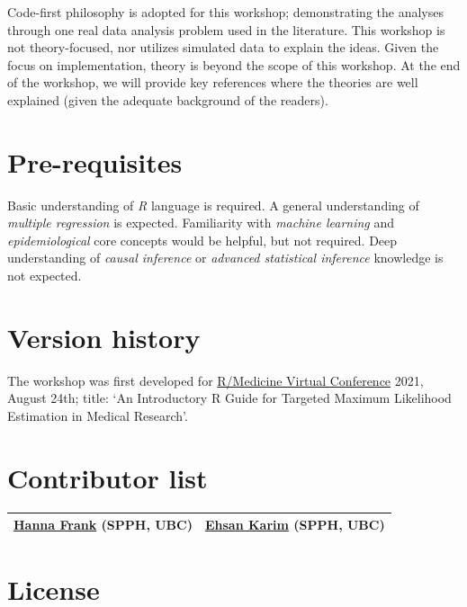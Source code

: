 \documentclass[
]{book}
\begin{document}
Code-first philosophy is adopted for this workshop; demonstrating the analyses through one real data analysis problem used in the literature. This workshop is not theory-focused, nor utilizes simulated data to explain the ideas. Given the focus on implementation, theory is beyond the scope of this workshop. At the end of the workshop, we will provide key references where the theories are well explained (given the adequate background of the readers).

\hypertarget{pre-requisites}{%
\section*{Pre-requisites}\label{pre-requisites}}

Basic understanding of \emph{R} language is required. A general understanding of \emph{multiple regression} is expected. Familiarity with \emph{machine learning} and \emph{epidemiological} core concepts would be helpful, but not required. Deep understanding of \emph{causal inference} or \emph{advanced statistical inference} knowledge is not expected.

\hypertarget{version-history}{%
\section*{Version history}\label{version-history}}

The workshop was first developed for \href{https://r-medicine.org/schedule/}{R/Medicine
Virtual Conference} 2021, August 24th; title: `An Introductory R Guide for Targeted Maximum Likelihood Estimation in Medical Research'.

\hypertarget{contributor-list}{%
\section*{Contributor list}\label{contributor-list}}

\begin{longtable}[]{@{}ll@{}}
\toprule
\endhead
\href{https://www.linkedin.com/in/hanna-f-940813b9/}{Hanna Frank} (SPPH, UBC) & \href{https://ehsank.com/}{Ehsan Karim} (SPPH, UBC)\tabularnewline
\bottomrule
\end{longtable}

\hypertarget{license}{%
\section*{License}\label{license}}
\end{document}

